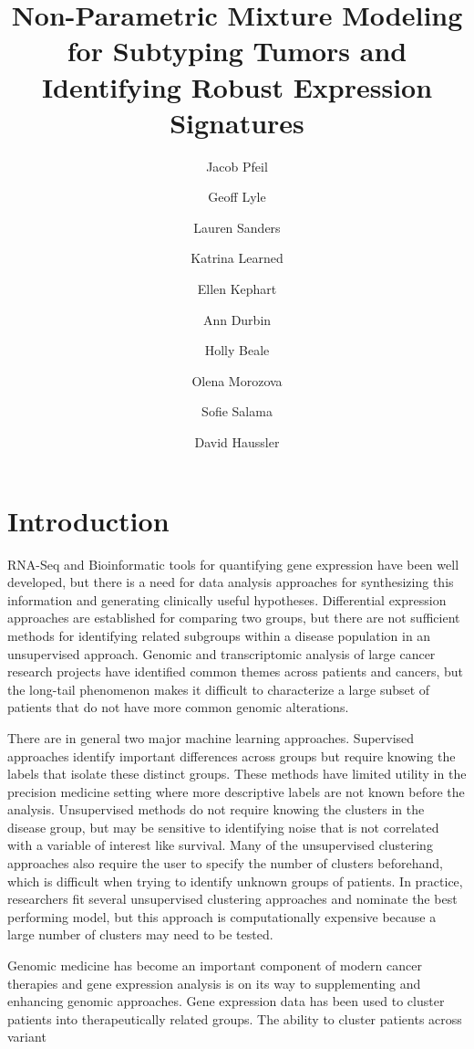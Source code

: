 \documentclass[fleqn,10pt]{wlscirep}
\title{Non-Parametric Mixture Modeling for Subtyping Tumors and Identifying Robust Expression Signatures}
\author[1,*]{Jacob Pfeil}
\author[1]{Geoff Lyle}
\author[1]{Lauren Sanders}
\author[1]{Katrina Learned}
\author[1]{Ellen Kephart}
\author[1]{Ann Durbin}
\author[1]{Holly Beale}
\author[1]{Olena Morozova}
\author[1]{Sofie Salama}
\author[1]{David Haussler}
\affil[1]{University of California, Santa Cruz, Biomolecular Engineering, Santa Cruz, 95064, United States}
\affil[*]{jpfeil@ucsc.edu}
\begin{document}
\flushbottom
\maketitle
%
%
\thispagestyle{empty}


\section*{Introduction}

RNA-Seq and Bioinformatic tools for quantifying gene expression have been well developed, but there is a need for data analysis approaches for synthesizing this information and generating clinically useful hypotheses. Differential expression approaches are established for comparing two groups, but there are not sufficient methods for identifying related subgroups within a disease population in an unsupervised approach. Genomic and transcriptomic analysis of large cancer research projects have identified common themes across patients and cancers, but the long-tail phenomenon makes it difficult to characterize a large subset of patients that do not have more common genomic alterations.

There are in general two major machine learning approaches. Supervised approaches identify important differences across groups but require knowing the labels that isolate these distinct groups. These methods have limited utility in the precision medicine setting where more descriptive labels are not known before the analysis. Unsupervised methods do not require knowing the clusters in the disease group, but may be sensitive to identifying noise that is not correlated with a variable of interest like survival. Many of the unsupervised clustering approaches also require the user to specify the number of clusters beforehand, which is difficult when trying to identify unknown groups of patients. In practice, researchers fit several unsupervised clustering approaches and nominate the best performing model, but this approach is computationally expensive because a large number of clusters may need to be tested. 

Genomic medicine has become an important component of modern cancer therapies and gene expression analysis is on its way to supplementing and enhancing genomic approaches. Gene expression data has been used to cluster patients into therapeutically related groups. The ability to cluster patients across variant
\end{document}
